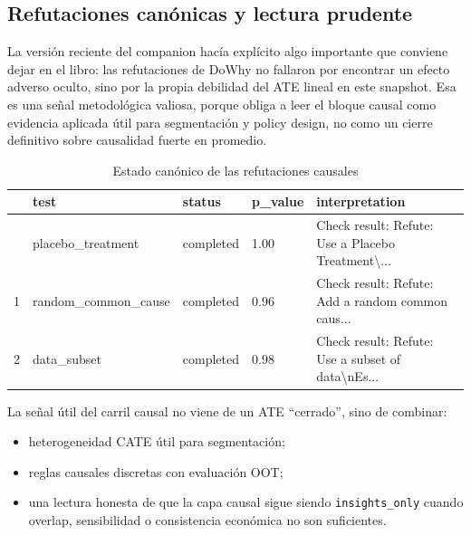 \documentclass[
  spanish,
  11pt,
  letterpaper,
]{scrbook}
\providecommand{\tightlist}{%
  \setlength{\itemsep}{0pt}\setlength{\parskip}{0pt}}
\theoremstyle{plain}
\theoremstyle{remark}
\begin{document}
\subsection{Refutaciones canónicas y lectura
prudente}\label{refutaciones-canuxf3nicas-y-lectura-prudente}

La versión reciente del companion hacía explícito algo importante que
conviene dejar en el libro: las refutaciones de DoWhy no fallaron por
encontrar un efecto adverso oculto, sino por la propia debilidad del ATE
lineal en este snapshot. Esa es una señal metodológica valiosa, porque
obliga a leer el bloque causal como evidencia aplicada útil para
segmentación y policy design, no como un cierre definitivo sobre
causalidad fuerte en promedio.

{

\begin{longtable}[]{@{}lllll@{}}

\caption{\label{tbl-causal-refutation-status}Estado canónico de las
refutaciones causales}

\tabularnewline

\toprule\noalign{}
& test & status & p\_value & interpretation \\
\midrule\noalign{}
\endhead
\bottomrule\noalign{}
\endlastfoot
0 & placebo\_treatment & completed & 1.00 & Check result: Refute: Use a
Placebo Treatment\textbackslash... \\
1 & random\_common\_cause & completed & 0.96 & Check result: Refute: Add
a random common caus... \\
2 & data\_subset & completed & 0.98 & Check result: Refute: Use a subset
of data\textbackslash nEs... \\

\end{longtable}

}

\begin{tcolorbox}[enhanced jigsaw, arc=.35mm, bottomrule=.15mm, bottomtitle=1mm, breakable, colback=white, colbacktitle=quarto-callout-note-color!10!white, colframe=quarto-callout-note-color-frame, coltitle=black, left=2mm, leftrule=.75mm, opacityback=0, opacitybacktitle=0.6, rightrule=.15mm, title=\textcolor{quarto-callout-note-color}{\faInfo}\hspace{0.5em}{Cómo leer este resultado}, titlerule=0mm, toprule=.15mm, toptitle=1mm]

La señal útil del carril causal no viene de un ATE ``cerrado'', sino de
combinar:

\begin{itemize}
\tightlist
\item
  heterogeneidad CATE útil para segmentación;
\item
  reglas causales discretas con evaluación OOT;
\item
  una lectura honesta de que la capa causal sigue siendo
  \texttt{insights\_only} cuando overlap, sensibilidad o consistencia
  económica no son suficientes.
\end{itemize}

\end{tcolorbox}
\end{document}

